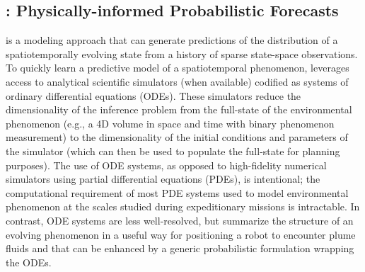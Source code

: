

\subsection{\PHUMES: Physically-informed Probabilistic Forecasts}
\label{sec:phumes}
\PHUMES is a modeling approach that can generate predictions of the distribution of a spatiotemporally evolving state from a history of sparse state-space observations. To quickly learn a predictive model of a spatiotemporal phenomenon, \PHUMES leverages access to analytical scientific simulators (when available) codified as systems of ordinary differential equations (ODEs). These simulators reduce the dimensionality of the inference problem from the full-state of the environmental phenomenon (e.g., a 4D volume in space and time with binary phenomenon measurement) to the dimensionality of the initial conditions and parameters of the simulator (which can then be used to populate the full-state for planning purposes). The use of ODE systems, as opposed to high-fidelity numerical simulators using partial differential equations (PDEs), is intentional; the computational requirement of most PDE systems used to model environmental phenomenon at the scales studied during expeditionary missions is intractable. In contrast, ODE systems are less well-resolved, but summarize the structure of an evolving phenomenon in a useful way for positioning a robot to encounter plume fluids and that can be enhanced by a generic probabilistic formulation wrapping the ODEs.

